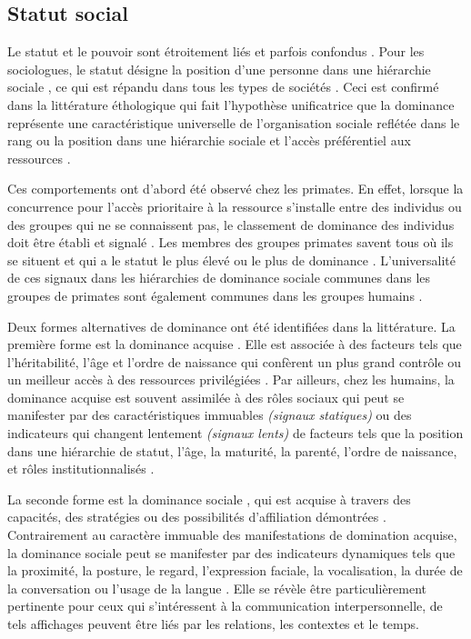 \subsection{Statut social}

	Le statut et le pouvoir sont étroitement liés et parfois confondus \cite{burgoon1998nature}. Pour les sociologues, le statut désigne la position d'une personne dans une hiérarchie sociale \cite{ellyson1985power}, ce qui est répandu dans tous les types de sociétés \cite{lips1991women}.
	Ceci est confirmé  dans la littérature éthologique qui fait l'hypothèse unificatrice que la dominance représente une caractéristique universelle de l'organisation sociale reflétée dans le rang ou la position dans une hiérarchie sociale \cite{burgoon1998nature} et l'accès préférentiel aux ressources \cite{liska1990dominance}.
	
	Ces comportements ont d'abord été observé chez les primates. En effet, lorsque la concurrence pour l'accès prioritaire à la ressource s'installe entre des individus ou des groupes qui ne se connaissent pas, le classement de dominance des individus doit être établi et signalé \cite{burgoon1998nature}. Les membres des groupes primates savent tous où ils se situent et qui a le statut le plus élevé ou le plus de dominance \cite{smither1993authoritarianism}.
	L'universalité de ces signaux  dans les hiérarchies de dominance sociale communes dans les groupes de primates sont également communes dans les groupes humains \cite{burgoon1998nature}.
	
	Deux formes alternatives de dominance ont été identifiées dans la littérature.
	La première forme est la dominance acquise \cite{liska1990dominance}. Elle est associée à des facteurs tels que l'héritabilité, l'âge et l'ordre de naissance qui confèrent un plus grand contrôle ou un meilleur accès à des ressources privilégiées \cite{cattell1970handbook}.
	Par ailleurs, chez les humains, la dominance acquise est souvent assimilée à des rôles sociaux qui peut se manifester par des caractéristiques immuables \textit{(signaux statiques)} ou des indicateurs qui changent lentement \textit{(signaux lents)} de facteurs tels que la position dans une hiérarchie de statut, l'âge, la maturité, la parenté, l'ordre de naissance, et rôles institutionnalisés \cite{burgoonnonverbal}. 
	
	La seconde forme est la dominance sociale \cite{liska1990dominance}, qui est acquise à travers des capacités, des stratégies ou des possibilités d'affiliation démontrées \cite{burgoon1998nature}. Contrairement au caractère immuable des manifestations de domination acquise, la dominance sociale peut se manifester par des indicateurs dynamiques tels que la proximité, la posture, le regard, l'expression faciale, la vocalisation, la durée de la conversation ou l'usage de la langue \cite{keating1985human}. Elle se révèle être particulièrement pertinente pour ceux qui s'intéressent à la communication interpersonnelle, de tels affichages peuvent être liés par les relations, les contextes et le temps\cite{burgoon1998nature}.
		
